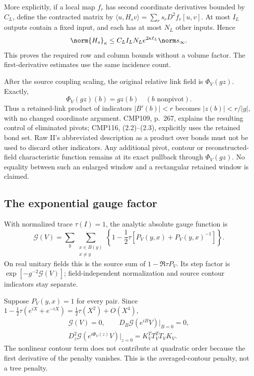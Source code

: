 More explicitly, if a local map $f_r$ has second coordinate
derivatives bounded by $C_L$, define the contracted matrix by
$\langle u,H_sv\rangle=\sum_rs_rD^2f_r[u,v]$. At most $I_L$
outputs contain a fixed input, and each has at most $N_L$
other inputs. Hence
\begin{equation}\label{pc-contracted-tensor}
 \norm{H_s}_\kappa\le
 C_LI_LN_Le^{2\kappa\ell_L}\norm s_\infty.
\end{equation}
This proves the required row and column bounds without a volume
factor. The first-derivative estimates use the same incidence
count.

After the source coupling scaling, the original relative link
field is $\Phi_V(gz)$. Exactly,
\begin{equation}\label{pc-cutoff-identity}
 \Phi_V(gz)(b)=gz(b)\quad(b\text{ nonpivot}).
\end{equation}
Thus a retained-link product of indicators $|B'(b)|<r$ becomes
$|z(b)|<r/|g|$, with no changed coordinate argument. CMP109,
p.~267, explains the resulting control of eliminated pivots;
CMP116, (2.2)--(2.3), explicitly uses the retained bond set.
Raw II's abbreviated description as a product over bonds must
not be used to discard other indicators. Any additional pivot,
contour or reconstructed-field characteristic function remains
at its exact pullback through $\Phi_V(gz)$. No equality between
such an enlarged window and a rectangular retained window is
claimed.

\subsection{The exponential gauge factor}
\label{pc-gauge-section}

With normalized trace $\tau(I)=1$, the analytic absolute gauge
function is
\begin{equation}\label{pc-gauge-function}
 \mathcal G(V)=\sum_y\sum_{\substack{x\in B(y)\\x\ne y}}
 \left\{1-\frac12\tau[P_V(y,x)+P_V(y,x)^{-1}]\right\}.
\end{equation}
On real unitary fields this is the source sum of
$1-\Re\tau P_V$. Its step factor is
$\exp[-g^{-2}\mathcal G(V)]$; field-independent normalization
and source contour indicators stay separate.

Suppose $P_V(y,x)=1$ for every pair. Since
$1-\tfrac12\tau(e^{iX}+e^{-iX})=\tfrac12\tau(X^2)+O(X^4)$,
\begin{equation}\label{pc-gauge-hessian}
 \begin{gathered}
 \mathcal G(V)=0,\qquad
 D_B\mathcal G(e^{iB}V)|_{B=0}=0,\\
 D_z^2\mathcal G(e^{i\Phi_V(z)}V)|_{z=0}
      =K_V^TT_V^TT_VK_V.
 \end{gathered}
\end{equation}
The nonlinear contour term does not contribute at quadratic
order because the first derivative of the penalty vanishes.
This is the averaged-contour penalty, not a tree penalty.

